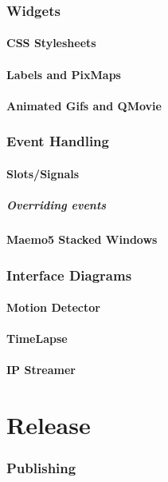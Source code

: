 \documentclass[11pt]{article} %
\begin{document}
\section{Widgets}
\subsection{CSS Stylesheets}
\subsection{Labels and PixMaps}
\subsection{Animated Gifs and QMovie}
\section{Event Handling}
\subsection{Slots/Signals}
\subsubsection{Overriding events}
\subsection{Maemo5 Stacked Windows}
\section{Interface Diagrams}
\subsection{Motion Detector}
\subsection{TimeLapse}
\subsection{IP Streamer}

\part{Release}
\section{Publishing}
\end{document}
